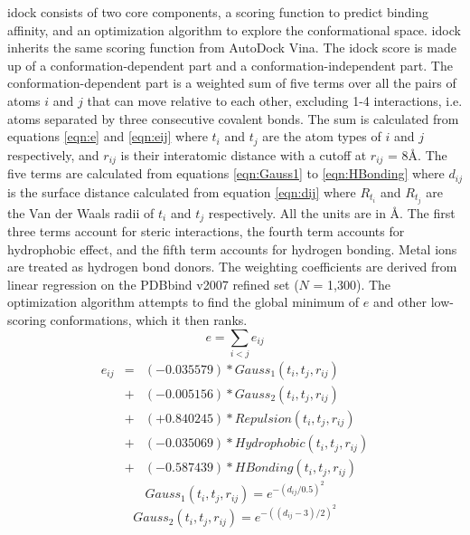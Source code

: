 idock consists of two core components, a scoring function to predict binding affinity, and an optimization algorithm to explore the conformational space. idock inherits the same scoring function from AutoDock Vina. The idock score is made up of a conformation-dependent part and a conformation-independent part. The conformation-dependent part is a weighted sum of five terms over all the pairs of atoms $i$ and $j$ that can move relative to each other, excluding 1-4 interactions, i.e. atoms separated by three consecutive covalent bonds. The sum is calculated from equations \eqref{eqn:e} and \eqref{eqn:eij} where $t_i$ and $t_j$ are the atom types of $i$ and $j$ respectively, and $r_{ij}$ is their interatomic distance with a cutoff at $r_{ij}$ = 8\AA. The five terms are calculated from equations \eqref{eqn:Gauss1} to \eqref{eqn:HBonding} where $d_{ij}$ is the surface distance calculated from equation \eqref{eqn:dij} where $R_{t_i}$ and $R_{t_j}$ are the Van der Waals radii of $t_i$ and $t_j$ respectively. All the units are in \AA. The first three terms account for steric interactions, the fourth term accounts for hydrophobic effect, and the fifth term accounts for hydrogen bonding. Metal ions are treated as hydrogen bond donors. The weighting coefficients are derived from linear regression on the PDBbind \cite{529,530} v2007 refined set ($N$ = 1,300). The optimization algorithm attempts to find the global minimum of $e$ and other low-scoring conformations, which it then ranks.
\begin{equation}
\label{eqn:e}
e = \sum_{i < j} e_{ij}
\end{equation}
\begin{eqnarray}
\label{eqn:eij}
e_{ij} &=& (-0.035579) * Gauss_1(t_i, t_j, r_{ij}) \nonumber \\
       &+& (-0.005156) * Gauss_2(t_i, t_j, r_{ij}) \nonumber \\
       &+& (+0.840245) * Repulsion(t_i, t_j, r_{ij}) \nonumber \\
       &+& (-0.035069) * Hydrophobic(t_i, t_j, r_{ij}) \nonumber \\
       &+& (-0.587439) * HBonding(t_i, t_j, r_{ij})
\end{eqnarray}
\begin{equation}
\label{eqn:Gauss1}
Gauss_1(t_i, t_j, r_{ij}) = e^{-(d_{ij} / 0.5)^2}
\end{equation}
\begin{equation}
\label{eqn:Gauss2}
Gauss_2(t_i, t_j, r_{ij}) = e^{-((d_{ij} - 3) / 2)^2}
\end{equation}
